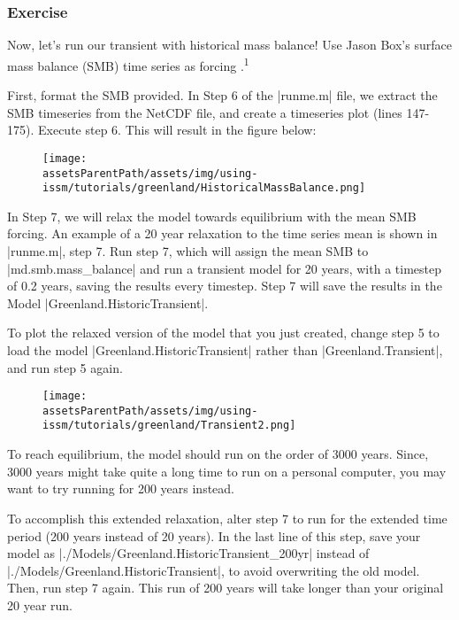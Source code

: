 \subsubsection{Exercise} %
Now, let's run our transient with historical mass balance! Use Jason Box's surface mass balance (SMB) time series as forcing \citep{Box2013a,Box2013b,Box2013c}.\textsuperscript{1}

First, format the SMB provided. In Step 6 of the \lstinlinebg|runme.m| file, we extract the SMB timeseries from the NetCDF file, and create a timeseries plot (lines 147-175). Execute step 6. This will result in the figure below:
\begin{figure}[H]
	\begin{center}
		\texttt{[image: \\assetsParentPath/assets/img/using-issm/tutorials/greenland/HistoricalMassBalance.png]}
	\end{center}
\end{figure}

In Step 7, we will relax the model towards equilibrium with the mean SMB forcing. An example of a 20 year relaxation to the time series mean is shown in \lstinlinebg|runme.m|, step 7. Run step 7, which will assign the mean SMB to \lstinlinebg|md.smb.mass_balance| and run a transient model for 20 years, with a timestep of 0.2 years, saving the results every timestep. Step 7 will save the results in the Model \lstinlinebg|Greenland.HistoricTransient|.

To plot the relaxed version of the model that you just created, change step 5 to load the model \lstinlinebg|Greenland.HistoricTransient| rather than \lstinlinebg|Greenland.Transient|, and run step 5 again.

\begin{figure}[H]
	\begin{center}
		\texttt{[image: \\assetsParentPath/assets/img/using-issm/tutorials/greenland/Transient2.png]}
	\end{center}
\end{figure}

To reach equilibrium, the model should run on the order of 3000 years. Since, 3000 years might take quite a long time to run on a personal computer, you may want to try running for 200 years instead.

To accomplish this extended relaxation, alter step 7 to run for the extended time period (200 years instead of 20 years). In the last line of this step, save your model as \lstinlinebg|./Models/Greenland.HistoricTransient_200yr| instead of \lstinlinebg|./Models/Greenland.HistoricTransient|, to avoid overwriting the old model. Then, run step 7 again. This run of 200 years will take longer than your original 20 year run.


